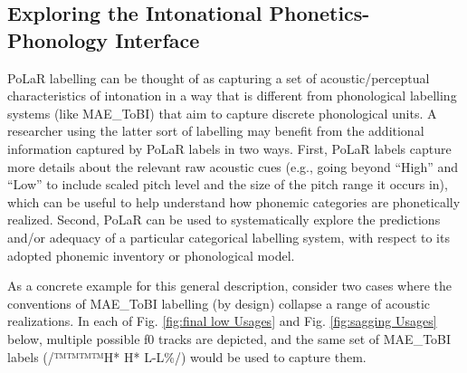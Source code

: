 \documentclass[11pt, twoside]{memoir}
\begin{document}
\subsection{Exploring the Intonational Phonetics-Phonology Interface}\label{sec:exploring-phonetics-phonology-interface}
PoLaR labelling can be thought of as capturing a set of acoustic\slash perceptual characteristics of intonation in a way that is different from phonological labelling systems (like MAE\_ToBI) that aim to capture discrete phonological units. A researcher using the latter sort of labelling may benefit from the additional information captured by PoLaR labels in two ways. First, PoLaR labels capture more details about the relevant raw acoustic cues (e.g., going beyond “High” and “Low” to include scaled pitch level and the size of the pitch range it occurs in), which can be useful to help understand how phonemic categories are phonetically realized. Second, PoLaR can be used to systematically explore the predictions and/or adequacy of a particular categorical labelling system, with respect to its adopted phonemic inventory or phonological model.

As a concrete example for this general description, consider two cases where the conventions of MAE\_ToBI labelling (by design) collapse a range of acoustic realizations. In each of Fig. \ref{fig:final low Usages} and Fig. \ref{fig:sagging Usages} below, multiple possible f0 tracks are depicted, and the same set of MAE\_ToBI labels (/™™™™{H* H* L-L\%}/) would be used to capture them.
\end{document}
